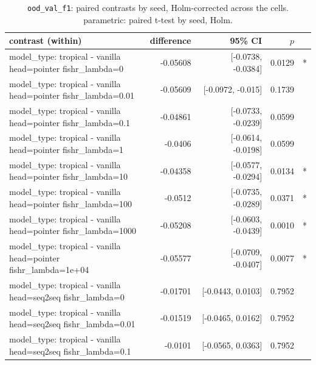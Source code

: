 \documentclass[10pt]{article}
\makeatletter
\newcommand{\stackcell}[1]{\begin{tabular}[t]{@{}l@{}}#1\end{tabular}}
\makeatother
\begin{document}
{\small
\begin{longtable}{lrrrl}
\caption{\texttt{ood\_val\_f1}: paired contrasts by seed, Holm-corrected across the cells. parametric: paired t-test by seed, Holm.}\label{tab:paired-ood_val_f1}\\
\toprule
contrast (within) & difference & 95\% CI & $p$ & \\
\midrule
\endhead
\stackcell{model\_type: tropical - vanilla\\\footnotesize head=pointer fishr\_lambda=0 } & -0.05608 & [-0.0738, -0.0384] & 0.0129 & *\\
\stackcell{model\_type: tropical - vanilla\\\footnotesize head=pointer fishr\_lambda=0.01 } & -0.05609 & [-0.0972, -0.015] & 0.1739 & \\
\stackcell{model\_type: tropical - vanilla\\\footnotesize head=pointer fishr\_lambda=0.1 } & -0.04861 & [-0.0733, -0.0239] & 0.0599 & \\
\stackcell{model\_type: tropical - vanilla\\\footnotesize head=pointer fishr\_lambda=1 } & -0.0406 & [-0.0614, -0.0198] & 0.0599 & \\
\stackcell{model\_type: tropical - vanilla\\\footnotesize head=pointer fishr\_lambda=10 } & -0.04358 & [-0.0577, -0.0294] & 0.0134 & *\\
\stackcell{model\_type: tropical - vanilla\\\footnotesize head=pointer fishr\_lambda=100 } & -0.0512 & [-0.0735, -0.0289] & 0.0371 & *\\
\stackcell{model\_type: tropical - vanilla\\\footnotesize head=pointer fishr\_lambda=1000 } & -0.05208 & [-0.0603, -0.0439] & 0.0010 & *\\
\stackcell{model\_type: tropical - vanilla\\\footnotesize head=pointer fishr\_lambda=1e+04 } & -0.05577 & [-0.0709, -0.0407] & 0.0077 & *\\
\stackcell{model\_type: tropical - vanilla\\\footnotesize head=seq2seq fishr\_lambda=0 } & -0.01701 & [-0.0443, 0.0103] & 0.7952 & \\
\stackcell{model\_type: tropical - vanilla\\\footnotesize head=seq2seq fishr\_lambda=0.01 } & -0.01519 & [-0.0465, 0.0162] & 0.7952 & \\
\stackcell{model\_type: tropical - vanilla\\\footnotesize head=seq2seq fishr\_lambda=0.1 } & -0.0101 & [-0.0565, 0.0363] & 0.7952 & \\

\end{longtable}}
\end{document}
